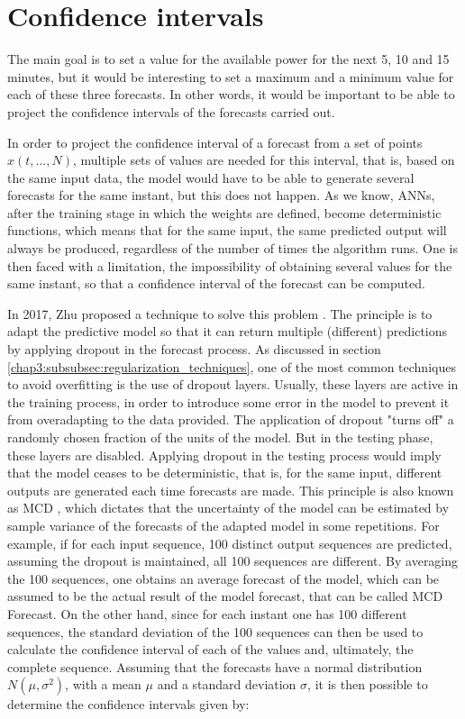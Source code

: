 \newpage
\section{Confidence intervals}\label{chap3:section:stage_3}

The main goal is to set a value for the available power for the next 5, 10 and 15 minutes, but it would be interesting to set a maximum and a minimum value for each of these three forecasts. In other words, it would be important to be able to project the confidence intervals of the forecasts carried out. 

In order to project the confidence interval of a forecast from a set of points $x(t, ..., N)$, multiple sets of values are needed for this interval, that is, based on the same input data, the model would have to be able to generate several forecasts for the same instant, but this does not happen. As we know, \ac{ANNs}, after the training stage in which the weights are defined, become deterministic functions, which means that for the same input, the same predicted output will always be produced, regardless of the number of times the algorithm runs. One is then faced with a limitation, the impossibility of obtaining several values for the same instant, so that a confidence interval of the forecast can be computed.

In 2017, Zhu proposed a technique to solve this problem \cite{uber}. The principle is to adapt the predictive model so that it can return multiple (different) predictions by applying dropout in the forecast process. As discussed in section \ref{chap3:subsubsec:regularization_techniques}, one of the most common techniques to avoid overfitting is the use of dropout layers. Usually, these layers are active in the training process, in order to introduce some error in the model to prevent it from overadapting to the data provided. The application of dropout "turns off" a randomly chosen fraction of the units of the model. But in the testing phase, these layers are disabled. Applying dropout in the testing process would imply that the model ceases to be deterministic, that is, for the same input, different outputs are generated each time forecasts are made. 
This principle is also known as \ac{MCD} \cite{uber2}, which dictates that the uncertainty of the model can be estimated by sample variance of the forecasts of the adapted model in some repetitions. For example, if for each input sequence, 100 distinct output sequences are predicted, assuming the dropout is maintained, all 100 sequences are different. By averaging the 100 sequences, one obtains an average forecast of the model, which can be assumed to be the actual result of the model forecast, that can be called \acl{MCD} Forecast. On the other hand, since for each instant one has 100 different sequences, the standard deviation of the 100 sequences can then be used to calculate the confidence interval of each of the values and, ultimately, the complete sequence. Assuming that the forecasts have a normal distribution $N(\mu, \sigma^2)$, with a mean $\mu$ and a standard deviation $\sigma$, it is then possible to determine the confidence intervals given by: 

